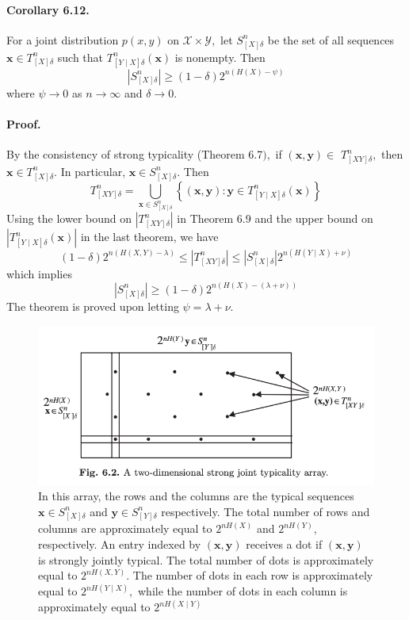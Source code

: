 \documentclass[8pt]{article}
\begin{document}
\begin{tcolorbox}
\paragraph{Corollary 6.12.} For a joint distribution $p(x, y)$ on $\mathcal{X} \times \mathcal{Y},$ let $S_{[X] \delta}^{n}$ be the set of all sequences $\mathbf{x} \in T_{[X] \delta}^{n}$ such that $T_{[Y \mid X] \delta}^{n}(\mathbf{x})$ is nonempty. Then
$$
\left|S_{[X] \delta}^{n}\right| \geq(1-\delta) 2^{n(H(X)-\psi)}
$$
where $\psi \rightarrow 0$ as $n \rightarrow \infty$ and $\delta \rightarrow 0 .$
\end{tcolorbox}
\paragraph{Proof.} By the consistency of strong typicality (Theorem 6.7$),$ if $(\mathbf{x}, \mathbf{y}) \in$ $T_{[X Y] \delta}^{n},$ then $\mathbf{x} \in T_{[X] \delta}^{n} .$ In particular, $\mathbf{x} \in S_{[X] \delta}^{n} .$ Then
$$
T_{[X Y] \delta}^{n}=\bigcup_{\mathbf{x} \in S_{[X] \delta}^{n}}\left\{(\mathbf{x}, \mathbf{y}): \mathbf{y} \in T_{[Y \mid X] \delta}^{n}(\mathbf{x})\right\}
$$
Using the lower bound on $\left|T_{[X Y] \delta}^{n}\right|$ in Theorem 6.9 and the upper bound on $\left|T_{[Y \mid X] \delta}^{n}(\mathbf{x})\right|$ in the last theorem, we have
$$
(1-\delta) 2^{n(H(X, Y)-\lambda)} \leq\left|T_{[X Y] \delta}^{n}\right| \leq\left|S_{[X] \delta}^{n}\right| 2^{n(H(Y \mid X)+\nu)}
$$
which implies
$$
\left|S_{[X] \delta}^{n}\right| \geq(1-\delta) 2^{n(H(X)-(\lambda+\nu))}
$$
The theorem is proved upon letting $\psi=\lambda+\nu$.

\begin{figure}[!h]
	\centering
	\includegraphics[width=0.7\linewidth]{imgs/exp6_2.png}
	\caption{In this array, the rows and the columns are the typical sequences $\mathbf{x} \in S_{[X] \delta}^{n}$ and $\mathbf{y} \in S_{[Y] \delta}^{n}$ respectively. The total number of rows and columns are approximately equal to $2^{n H(X)}$ and $2^{n H(Y)},$ respectively. An entry indexed by $(\mathbf{x}, \mathbf{y})$ receives a dot if $(\mathbf{x}, \mathbf{y})$ is strongly jointly typical. The total number of dots is approximately equal to $2^{n H(X, Y)}$. The number of dots in each row is approximately equal to $2^{n H(Y \mid X)},$ while the number of dots in each column is approximately equal to $2^{n H(X \mid Y)}$}
	\label{fig:my_label}
\end{figure}
\end{document}
